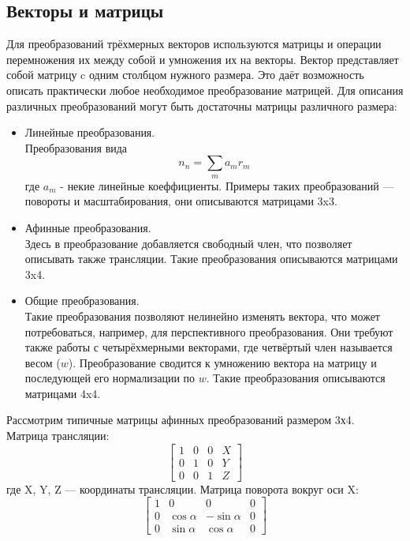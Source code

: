 \documentclass[a4paper,12pt]{report}
\numberwithin{equation}{section}
\begin{document}
\subsection{Векторы и матрицы}
Для преобразований трёхмерных векторов используются матрицы и операции перемножения их между собой и умножения их на векторы. Вектор представляет собой матрицу c одним столбцом нужного размера. Это даёт возможность описать практически любое необходимое преобразование матрицей. Для описания различных преобразований могут быть достаточны матрицы различного размера:
\begin{itemize}
\item Линейные преобразования. \\
Преобразования вида
\begin{equation*}
n_n = \sum_{m} a_m r_m
\end{equation*}
где $a_m$ - некие линейные коеффициенты. Примеры таких преобразований --- повороты и масштабирования, они описываются матрицами 3x3.
\item Афинные преобразования. \\
Здесь в преобразование добавляется свободный член, что позволяет описывать также трансляции. Такие преобразования описываются матрицами 3x4.
\item Общие преобразования. \\
Такие преобразования позволяют нелинейно изменять вектора, что может потребоваться, например, для перспективного преобразования. Они требуют также работы с четырёхмерными векторами, где четвёртый член называется весом ($w$). Преобразование сводится к умножению вектора на матрицу и последующей его нормализации по $w$. Такие преобразования описываются матрицами 4x4.
\end{itemize}
Рассмотрим типичные матрицы афинных преобразований размером 3х4. \\
Матрица трансляции:
\begin{equation}
\begin{bmatrix}
1 & 0 & 0 & X \\
0 & 1 & 0 & Y \\
0 & 0 & 1 & Z
\end{bmatrix}
\end{equation}
где X, Y, Z --- координаты трансляции.
Матрица поворота вокруг оси X:
\begin{equation}
\begin{bmatrix}
1 & 0 & 0 & 0 \\
0 & \cos{\alpha} & -\sin{\alpha} & 0 \\
0 & \sin{\alpha} & \cos{\alpha} & 0
\end{bmatrix}
\end{equation}
\end{document}
